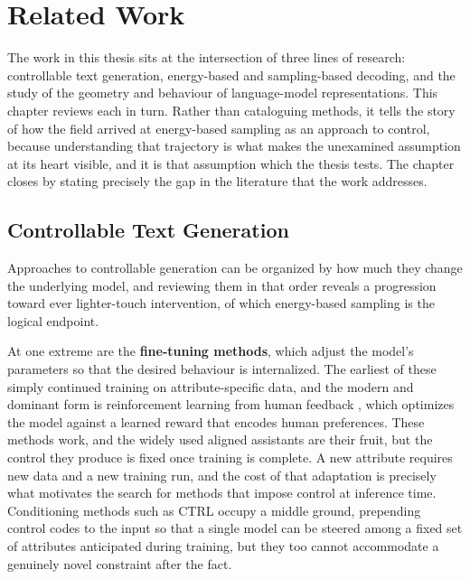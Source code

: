\chapter{Related Work}
\label{ch:related}

The work in this thesis sits at the intersection of three lines of research: controllable text generation, energy-based and sampling-based decoding, and the study of the geometry and behaviour of language-model representations. This chapter reviews each in turn. Rather than cataloguing methods, it tells the story of how the field arrived at energy-based sampling as an approach to control, because understanding that trajectory is what makes the unexamined assumption at its heart visible, and it is that assumption which the thesis tests. The chapter closes by stating precisely the gap in the literature that the work addresses.

\section{Controllable Text Generation}
\label{sec:rel-ctg}

Approaches to controllable generation can be organized by how much they change the underlying model, and reviewing them in that order reveals a progression toward ever lighter-touch intervention, of which energy-based sampling is the logical endpoint.

At one extreme are the \textbf{fine-tuning methods}, which adjust the model's parameters so that the desired behaviour is internalized. The earliest of these simply continued training on attribute-specific data, and the modern and dominant form is reinforcement learning from human feedback \citep{ouyang2022training}, which optimizes the model against a learned reward that encodes human preferences. These methods work, and the widely used aligned assistants are their fruit, but the control they produce is fixed once training is complete. A new attribute requires new data and a new training run, and the cost of that adaptation is precisely what motivates the search for methods that impose control at inference time. Conditioning methods such as CTRL \citep{keskar2019ctrl} occupy a middle ground, prepending control codes to the input so that a single model can be steered among a fixed set of attributes anticipated during training, but they too cannot accommodate a genuinely novel constraint after the fact.

